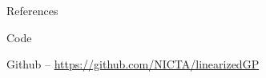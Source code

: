 \documentclass[final]{beamer}
\newlength{\onecolwid}
\begin{document}
\begin{frame}[t]
\begin{columns}[t]
\begin{column}{\onecolwid}




\begin{block}{References}

\small{
\vspace{0.75in}}

\end{block}









\vspace{-2cm}
\begin{alertblock}{Code}

Github -- \href{https://github.com/NICTA/linearizedGP}
                 {https://github.com/NICTA/linearizedGP}
\end{alertblock}


\end{column} %

\end{columns} %

\end{frame} %
\end{document}
